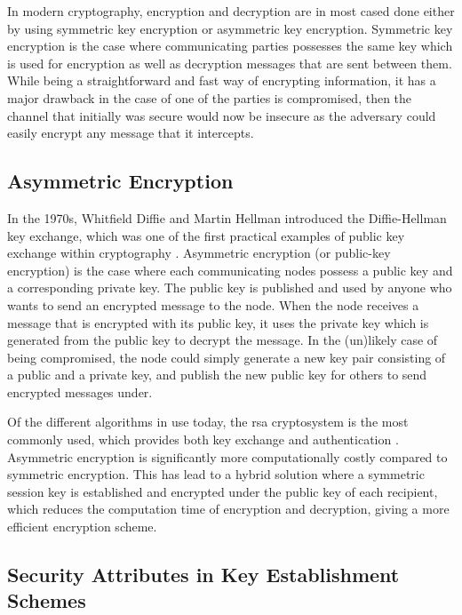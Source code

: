 In modern cryptography, encryption and decryption are in most cased done either by using symmetric key encryption or asymmetric key encryption. Symmetric key encryption is the case where communicating parties possesses the same key which is used for encryption as well as decryption messages that are sent between them. While being a straightforward and fast way of encrypting information, it has a major drawback in the case of one of the parties is compromised, then the channel that initially was secure would now be insecure as the adversary could easily encrypt any message that it intercepts.

\subsection{Asymmetric Encryption}

In the 1970s, Whitfield Diffie and Martin Hellman introduced the Diffie-Hellman key exchange, which was one of the first practical examples of public key exchange within cryptography \cite{diffie1976new}. Asymmetric encryption (or public-key encryption) is the case where each communicating nodes possess a public key and a corresponding private key. The public key is published and used by anyone who wants to send an encrypted message to the node. When the node receives a message that is encrypted with its public key, it uses the private key which is generated from the public key to decrypt the message. In the (un)likely case of being compromised, the node could simply generate a new key pair consisting of a public and a private key, and publish the new public key for others to send encrypted messages under.

Of the different algorithms in use today, the \gls{rsa} cryptosystem is the most commonly used, which provides both key exchange and authentication \cite{wander2005energy}. Asymmetric encryption is significantly more computationally costly compared to symmetric encryption. This has lead to a hybrid solution where a symmetric session key is established and encrypted under the public key of each recipient, which reduces the computation time of encryption and decryption, giving a more efficient encryption scheme.

\subsection{Security Attributes in Key Establishment Schemes}


